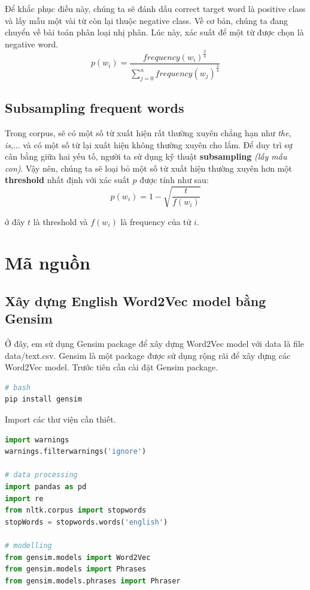 \documentclass[12pt]{article}
\newcommand{\twiceIndent}{\hspace{\parindent}}
\begin{document}
\indent Để khắc phục điều này, chúng ta sẽ đánh dấu correct target word là positive class và lấy mẫu một vài từ còn lại thuộc negative class. Về cơ bản, chúng ta đang chuyển về bài toán phân loại nhị phân. Lúc này, xác suất để một từ được chọn là negative word.
$$p(w_i) = \dfrac{frequency(w_i)^{\frac{3}{4}}}{\sum^n_{j=0} frequency(w_j)^{\frac{3}{4}}}$$

\subsection{Subsampling frequent words}
Trong corpus, sẽ có một số từ xuất hiện rất thường xuyên chẳng hạn như \textsl{the}, \textsl{is},... và có một số từ lại xuất hiện không thường xuyên cho lắm. Để duy trì sự cân bằng giữa hai yếu tố, người ta sử dụng kỹ thuật \textbf{subsampling} \textit{(lấy mẫu con)}. Vậy nên, chúng ta sẽ loại bỏ một số từ xuất hiện thường xuyên hơn một \textbf{threshold} nhất định với xác suất $p$ được tính như sau:
$$p(w_i) = 1 - \sqrt{\dfrac{t}{f(w_i)}}$$

\twiceIndent ở đây $t$ là threshold và $f(w_i)$ là frequency của tử $i$.

\section{Mã nguồn}
\subsection{Xây dựng English Word2Vec model bằng Gensim}
Ở đây, em sử dụng Gensim package để xây dựng Word2Vec model với data là file \textsf{data/text.csv}. Gensim là một package được sử dụng rộng rãi để xây dựng các Word2Vec model. Trước tiên cần cài đặt Gensim package.
\begin{lstlisting}[language=bash]
# bash
pip install gensim
\end{lstlisting}

\vskip 0.5cm
\indent Import các thư viện cần thiết.
\begin{lstlisting}[language=python]
import warnings
warnings.filterwarnings('ignore')

# data processing
import pandas as pd
import re
from nltk.corpus import stopwords
stopWords = stopwords.words('english')

# modelling
from gensim.models import Word2Vec
from gensim.models import Phrases
from gensim.models.phrases import Phraser
\end{lstlisting}
\end{document}
